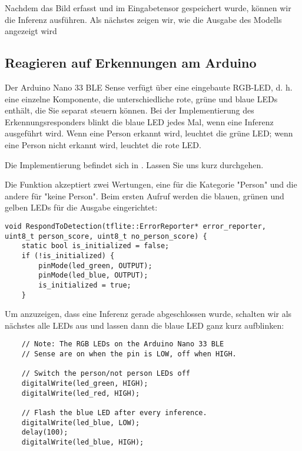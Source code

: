 Nachdem das Bild erfasst und im Eingabetensor gespeichert wurde, können wir die Inferenz ausführen. Als nächstes zeigen wir, wie die Ausgabe des Modells angezeigt wird

\subsection{Reagieren auf Erkennungen am Arduino}

Der Arduino Nano 33 BLE Sense verfügt über eine eingebaute RGB-LED, d. h. eine einzelne Komponente, die unterschiedliche rote, grüne und blaue LEDs enthält, die Sie separat steuern können. Bei der Implementierung des Erkennungsresponders blinkt die blaue LED jedes Mal, wenn eine Inferenz ausgeführt wird. Wenn eine Person erkannt wird, leuchtet die grüne LED; wenn eine Person nicht erkannt wird, leuchtet die rote LED.

Die Implementierung befindet sich in . Lassen Sie uns kurz durchgehen.

Die Funktion  akzeptiert zwei Wertungen, eine für die Kategorie "Person" und die andere für "keine Person". Beim ersten Aufruf werden die blauen, grünen und gelben LEDs für die Ausgabe eingerichtet:

\begin{code}
    \begin{lstlisting}
void RespondToDetection(tflite::ErrorReporter* error_reporter,
uint8_t person_score, uint8_t no_person_score) {
    static bool is_initialized = false;
    if (!is_initialized) {
        pinMode(led_green, OUTPUT);
        pinMode(led_blue, OUTPUT);
        is_initialized = true;
    }
  \end{lstlisting}
\end{code}

    Um anzuzeigen, dass eine Inferenz gerade abgeschlossen wurde, schalten wir als nächstes alle LEDs aus und lassen dann die blaue LED ganz kurz aufblinken:
    
\begin{code}
    \begin{lstlisting}
    // Note: The RGB LEDs on the Arduino Nano 33 BLE
    // Sense are on when the pin is LOW, off when HIGH.
    
    // Switch the person/not person LEDs off
    digitalWrite(led_green, HIGH);
    digitalWrite(led_red, HIGH);
    
    // Flash the blue LED after every inference.
    digitalWrite(led_blue, LOW);
    delay(100);
    digitalWrite(led_blue, HIGH);
  \end{lstlisting}
\end{code}

